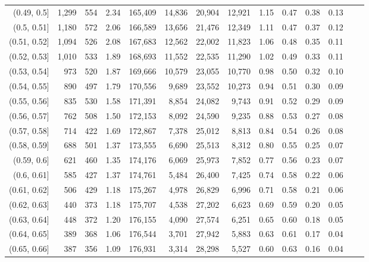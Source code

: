 \begin{tabular}{rrrrrrrrrrrrrr}
(0.49, 0.5]    &  1,299 &  554 &    2.34 &  165,409 &   14,836 &  20,904 &  12,921 &  1.15 &  0.47 &  0.38 &      0.13 \\
(0.5, 0.51]    &  1,180 &  572 &    2.06 &  166,589 &   13,656 &  21,476 &  12,349 &  1.11 &  0.47 &  0.37 &      0.12 \\
(0.51, 0.52]   &  1,094 &  526 &    2.08 &  167,683 &   12,562 &  22,002 &  11,823 &  1.06 &  0.48 &  0.35 &      0.11 \\
(0.52, 0.53]   &  1,010 &  533 &    1.89 &  168,693 &   11,552 &  22,535 &  11,290 &  1.02 &  0.49 &  0.33 &      0.11 \\
(0.53, 0.54]   &    973 &  520 &    1.87 &  169,666 &   10,579 &  23,055 &  10,770 &  0.98 &  0.50 &  0.32 &      0.10 \\
(0.54, 0.55]   &    890 &  497 &    1.79 &  170,556 &    9,689 &  23,552 &  10,273 &  0.94 &  0.51 &  0.30 &      0.09 \\
(0.55, 0.56]   &    835 &  530 &    1.58 &  171,391 &    8,854 &  24,082 &   9,743 &  0.91 &  0.52 &  0.29 &      0.09 \\
(0.56, 0.57]   &    762 &  508 &    1.50 &  172,153 &    8,092 &  24,590 &   9,235 &  0.88 &  0.53 &  0.27 &      0.08 \\
(0.57, 0.58]   &    714 &  422 &    1.69 &  172,867 &    7,378 &  25,012 &   8,813 &  0.84 &  0.54 &  0.26 &      0.08 \\
(0.58, 0.59]   &    688 &  501 &    1.37 &  173,555 &    6,690 &  25,513 &   8,312 &  0.80 &  0.55 &  0.25 &      0.07 \\
(0.59, 0.6]    &    621 &  460 &    1.35 &  174,176 &    6,069 &  25,973 &   7,852 &  0.77 &  0.56 &  0.23 &      0.07 \\
(0.6, 0.61]    &    585 &  427 &    1.37 &  174,761 &    5,484 &  26,400 &   7,425 &  0.74 &  0.58 &  0.22 &      0.06 \\
(0.61, 0.62]   &    506 &  429 &    1.18 &  175,267 &    4,978 &  26,829 &   6,996 &  0.71 &  0.58 &  0.21 &      0.06 \\
(0.62, 0.63]   &    440 &  373 &    1.18 &  175,707 &    4,538 &  27,202 &   6,623 &  0.69 &  0.59 &  0.20 &      0.05 \\
(0.63, 0.64]   &    448 &  372 &    1.20 &  176,155 &    4,090 &  27,574 &   6,251 &  0.65 &  0.60 &  0.18 &      0.05 \\
(0.64, 0.65]   &    389 &  368 &    1.06 &  176,544 &    3,701 &  27,942 &   5,883 &  0.63 &  0.61 &  0.17 &      0.04 \\
(0.65, 0.66]   &    387 &  356 &    1.09 &  176,931 &    3,314 &  28,298 &   5,527 &  0.60 &  0.63 &  0.16 &      0.04 \\

\end{tabular}
